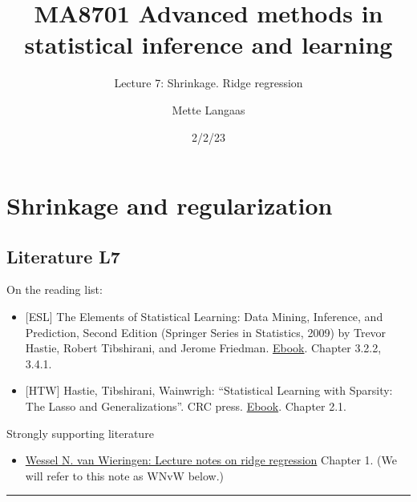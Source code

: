 \documentclass[
  letterpaper,
  DIV=11,
  numbers=noendperiod]{scrartcl}
\title{MA8701 Advanced methods in statistical inference and learning}
\subtitle{Lecture 7: Shrinkage. Ridge regression}
\author{Mette Langaas}
\date{2/2/23}
\providecommand{\tightlist}{%
  \setlength{\itemsep}{0pt}\setlength{\parskip}{0pt}}\usepackage{longtable,booktabs,array}
\renewcommand*\contentsname{Table of contents}
\newcommand\contentsname{Table of contents}
\begin{document}
\maketitle
\ifdefined\Shaded\renewenvironment{Shaded}{\begin{tcolorbox}[interior hidden, frame hidden, enhanced, breakable, sharp corners, borderline west={3pt}{0pt}{shadecolor}, boxrule=0pt]}{\end{tcolorbox}}\fi

\renewcommand*\contentsname{Table of contents}
{
\hypersetup{linkcolor=}
\setcounter{tocdepth}{3}
\tableofcontents
}
\hypertarget{shrinkage-and-regularization}{%
\section{Shrinkage and
regularization}\label{shrinkage-and-regularization}}

\hypertarget{literature-l7}{%
\subsection{Literature L7}\label{literature-l7}}

On the reading list:

\begin{itemize}
\item
  {[}ESL{]} The Elements of Statistical Learning: Data Mining,
  Inference, and Prediction, Second Edition (Springer Series in
  Statistics, 2009) by Trevor Hastie, Robert Tibshirani, and Jerome
  Friedman.
  \href{https://web.stanford.edu/~hastie/Papers/ESLII.pdf}{Ebook}.
  Chapter 3.2.2, 3.4.1.
\item
  {[}HTW{]} Hastie, Tibshirani, Wainwrigh: ``Statistical Learning with
  Sparsity: The Lasso and Generalizations''. CRC press.
  \href{https://hastie.su.domains/StatLearnSparsity/}{Ebook}. Chapter
  2.1.
\end{itemize}

Strongly supporting literature

\begin{itemize}
\tightlist
\item
  \href{https://arxiv.org/pdf/1509.09169v7.pdf}{Wessel N. van Wieringen:
  Lecture notes on ridge regression} Chapter 1. (We will refer to this
  note as WNvW below.)
\end{itemize}

\begin{center}\rule{0.5\linewidth}{0.5pt}\end{center}
\end{document}

